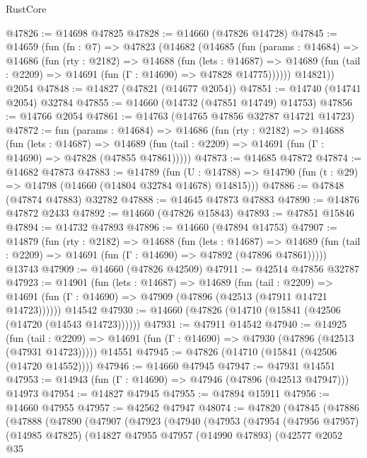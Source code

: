 \begin{lexlean}{RustCore}
\begin{coremodule}
@47826 := @14698 @47825
@47828 := @14660 (@47826 @14728)
@47845 := @14659
    (fun (fn : @7) =>
    @47823
      (@14682
        (@14685
          (fun (params : @14684) =>
          @14686
            (fun (rty : @2182) =>
            @14688
              (fun (lets : @14687) =>
              @14689 (fun (tail : @2209) => @14691 (fun (Γ : @14690) => @47828 @14775))))))
        @14821))
    @2054
@47848 := @14827 (@47821 (@14677 @2054))
@47851 := @14740 (@14741 @2054) @32784
@47855 := @14660 (@14732 (@47851 @14749) @14753)
@47856 := @14766 @2054
@47861 := @14763 (@14765 @47856 @32787 @14721 @14723)
@47872 := fun (params : @14684) =>
  @14686
    (fun (rty : @2182) =>
    @14688
      (fun (lets : @14687) =>
      @14689 (fun (tail : @2209) => @14691 (fun (Γ : @14690) => @47828 (@47855 @47861)))))
@47873 := @14685 @47872
@47874 := @14682 @47873
@47883 := @14789
    (fun (U : @14788) => @14790 (fun (t : @29) => @14798 (@14660 (@14804 @32784 @14678) @14815)))
@47886 := @47848 (@47874 @47883) @32782
@47888 := @14645 @47873 @47883
@47890 := @14876 @47872 @2433
@47892 := @14660 (@47826 @15843)
@47893 := @47851 @15846
@47894 := @14732 @47893
@47896 := @14660 (@47894 @14753)
@47907 := @14879
    (fun (rty : @2182) =>
    @14688
      (fun (lets : @14687) =>
      @14689 (fun (tail : @2209) => @14691 (fun (Γ : @14690) => @47892 (@47896 @47861)))))
    @13743
@47909 := @14660 (@47826 @42509)
@47911 := @42514 @47856 @32787
@47923 := @14901
    (fun (lets : @14687) =>
    @14689
      (fun (tail : @2209) =>
      @14691 (fun (Γ : @14690) => @47909 (@47896 (@42513 (@47911 @14721 @14723))))))
    @14542
@47930 := @14660 (@47826 (@14710 (@15841 (@42506 (@14720 (@14543 @14723))))))
@47931 := @47911 @14542
@47940 := @14925
    (fun (tail : @2209) => @14691 (fun (Γ : @14690) => @47930 (@47896 (@42513 (@47931 @14723)))))
    @14551
@47945 := @47826 (@14710 (@15841 (@42506 (@14720 @14552))))
@47946 := @14660 @47945
@47947 := @47931 @14551
@47953 := @14943 (fun (Γ : @14690) => @47946 (@47896 (@42513 @47947))) @14973
@47954 := @14827 @47945
@47955 := @47894 @15911
@47956 := @14660 @47955
@47957 := @42562 @47947
@48074 := @47820
    (@47845
      (@47886
        (@47888
          (@47890
            (@47907
              (@47923
                (@47940
                  (@47953
                    (@47954
                      (@47956 @47957)
                      (@14985 @47825)
                      (@14827
                        @47955
                        @47957
                        (@14990 @47893)
                        (@42577
                          @2052
                          @35

\end{coremodule}
\end{lexlean}
